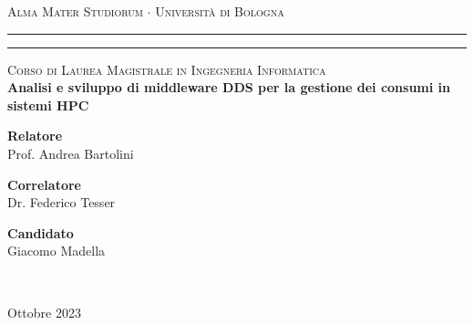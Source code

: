 
\begin{titlepage}
	\begin{center}
		{{\Large{\textsc{Alma Mater Studiorum $\cdot$ Universit\`a di
		Bologna}}}} \rule[0.1cm]{14cm}{0.1mm}
		\rule[0.5cm]{14cm}{0.6mm}
			\large{\textsc{Corso di Laurea Magistrale in Ingegneria Informatica}}
			\\[1.8cm]
			\LARGE
			{\bfseries Analisi e sviluppo di middleware DDS per la gestione dei consumi in sistemi HPC}\\[1.2cm]
	\end{center}
	\vspace{4.0cm}
	\vfill
	\begin{minipage}{0.39\textwidth}
		{\bfseries Relatore}\\
		Prof. Andrea Bartolini

		{\bfseries Correlatore}\\
		Dr. Federico Tesser  
	\end{minipage}
	\hfill
	\vspace{2cm}
	\begin{minipage}{0.39\textwidth}
		\begin{flushright} {\bfseries Candidato}\\
		Giacomo Madella \end{flushright} 
	\end{minipage} \\
\begin{center}
	Ottobre 2023
\end{center}

\end{titlepage}




